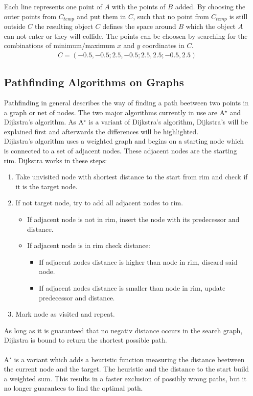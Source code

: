Each line represents one point of $A$ with the points of $B$ added. By choosing the outer points from $C_{temp}$ and put them in $C$, such that no point from $C_{temp}$ is still outside $C$  the resulting object $C$ defines the space around $B$ which the object $A$ can not enter or they will collide. The points can be choosen by searching for the combinations of minimum/maximum $x$ and $y$ coordinates in $C$.
\begin{align*}
C = (-0.5, -0.5; 2.5, -0.5; 2.5, 2.5; -0.5, 2.5)
\end{align*}

\subsection{Pathfinding Algorithms on Graphs}
Pathfinding in general describes the way of finding a path beetween two points in a graph or net of nodes. The two major algorithms currently in use are A$^\star$ and Dijkstra's algorithm. As A$^\star$ is a variant of Dijkstra's algorithm, Dijkstra's will be explained first and afterwards the differences will be highlighted.\\
Dijkstra's algorithm uses a weighted graph and begins on a starting node which is connected to a set of adjacent nodes. These adjacent nodes are the starting rim.
Dijkstra works in these steps:
\begin{enumerate}
\item Take unvisited node with shortest distance to the start from rim and check if it is the target node.
\item If not target node, try to add all adjacent nodes to rim.
\begin{itemize}
\item If adjacent node is not in rim, insert the node with its predecessor and distance.
\item If adjacent node is in rim check distance:
\begin{itemize}
\item If adjacent nodes distance is higher than node in rim, discard said node.
\item If adjacent nodes distance is smaller than node in rim, update predecessor and distance.
\end{itemize}
\end{itemize}
\item Mark node as visited and repeat.
\end{enumerate} 
As long as it is guaranteed that no negativ distance occurs in the search graph, Dijkstra is bound to return the shortest possible path.\\\\
A$^\star$ is a variant which adds a heuristic function measuring the distance beetween the current node and the target. The heuristic and the distance to the start build a weighted sum. This results in a faster exclusion of possibly wrong paths, but it no longer guarantees to find the optimal path.